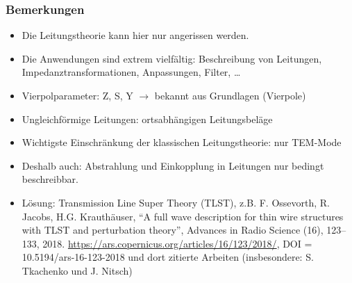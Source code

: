   \begin{frame}
    \frametitle{Bemerkungen}
      \begin{itemize}[<+->]
      \item Die Leitungstheorie kann hier nur angerissen werden.
      \item Die Anwendungen sind extrem vielfältig: Beschreibung von Leitungen, Impedanztransformationen, Anpassungen, Filter, \dots
        \item Vierpolparameter: Z, S, Y \(\to\) bekannt aus Grundlagen (Vierpole)
      \item \alert{Ungleichförmige Leitungen}: ortsabhängigen Leitungsbeläge
      \item Wichtigste Einschränkung der klassischen Leitungstheorie: \alert{nur TEM-Mode}
      \item Deshalb auch: Abstrahlung und Einkopplung in Leitungen nur bedingt beschreibbar.
        \item Lösung: \alert{Transmission Line Super Theory (TLST)}, z.B. F. Ossevorth, R. Jacobs, H.G. Krauthäuser,
\enquote{A full wave description for thin wire structures with TLST and perturbation theory}, Advances in Radio Science (16), 123--133, 2018. \url{https://ars.copernicus.org/articles/16/123/2018/}, DOI = 10.5194/ars-16-123-2018 und dort zitierte Arbeiten (insbesondere: S. Tkachenko und J. Nitsch)
  \end{itemize} 
  \end{frame}


        

   
